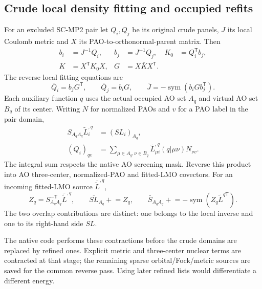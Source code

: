 \documentclass[11pt]{article}
\newcommand{\T}{^{\mathsf T}}
\newcommand{\sym}{\operatorname{sym}}
\begin{document}
\subsection{Crude local density fitting and occupied refits}
For an excluded SC-MP2 pair let $Q_i,Q_j$ be its original crude panels,
$J$ its local Coulomb metric and $X$ its PAO-to-orthonormal-parent matrix.
Then
\begin{align}
 b_i&=J^{-1}Q_i,& b_j&=J^{-1}Q_j,& K_0&=Q_i\T b_j,\\
 K&=X\T K_0 X,& G&=X\bar K X\T.&&
\end{align}
The reverse local fitting equations are
\begin{equation}
 \bar Q_i=b_jG\T,\qquad \bar Q_j=b_iG,\qquad
 \bar J=-\sym(b_iG b_j\T).
 \label{eq:gradient-crude-fit-bars}
\end{equation}
Each auxiliary function $q$ uses the actual occupied AO set $A_q$ and
virtual AO set $B_q$ of its center. Writing $N$ for normalized PAOs and
$v$ for a PAO label in the pair domain,
\begin{align}
 S_{A_qA_q}\widetilde L_i^{,q}&=(SL_i)_{A_q},\\
 (Q_i)_{qv}&=\sum_{\mu\in A_q,\nu\in B_q}
       \widetilde L_{\mu i}^{,q}(q|\mu\nu)N_{\nu v}.
 \label{eq:gradient-crude-panel}
\end{align}
The integral sum respects the native AO screening mask. Reverse this
product into AO three-center, normalized-PAO and fitted-LMO covectors.
For an incoming fitted-LMO source $\overline{\widetilde L}^{,q}$,
\begin{equation}
 Z_q=S_{A_qA_q}^{-\mathsf T}\overline{\widetilde L}^{,q},\qquad
 \overline{SL}_{A_q}\mathrel{+}=Z_q,\qquad
 \bar S_{A_qA_q}\mathrel{+}=-\sym(Z_q\widetilde L^{q\mathsf T}).
 \label{eq:gradient-crude-refit-bars}
\end{equation}
The two overlap contributions are distinct: one belongs to the local
inverse and one to its right-hand side $SL$.

The native code performs these contractions before the crude domains are
replaced by refined ones. Explicit metric and three-center nuclear terms
are contracted at that stage; the remaining sparse orbital/Fock/metric
sources are saved for the common reverse pass. Using later refined lists
would differentiate a different energy.
\end{document}
